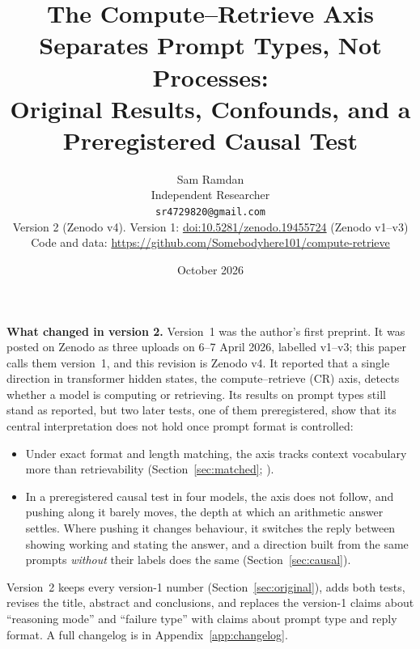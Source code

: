 \documentclass[11pt]{article}
\title{The Compute--Retrieve Axis Separates Prompt Types, Not Processes:\\ Original Results, Confounds, and a Preregistered Causal Test}
\author{
  Sam Ramdan\\
  Independent Researcher\\
  \texttt{sr4729820@gmail.com}\\[4pt]
  {\small Version 2 (Zenodo v4). Version 1: \href{https://doi.org/10.5281/zenodo.19455724}{doi:10.5281/zenodo.19455724} (Zenodo v1--v3)}\\
  {\small Code and data: \url{https://github.com/Somebodyhere101/compute-retrieve}}
}
\date{October 2026}
\begin{document}
\maketitle

\begin{framed}
\noindent\textbf{What changed in version 2.}
Version~1 was the author's first preprint. It was posted on Zenodo as three uploads on 6--7 April 2026, labelled v1--v3; this paper calls them version~1, and this revision is Zenodo v4. It reported that a single direction in transformer hidden states, the compute--retrieve (CR) axis, detects whether a model is computing or retrieving. Its results on prompt types still stand as reported, but two later tests, one of them preregistered, show that its central interpretation does not hold once prompt format is controlled:
\begin{itemize}
  \item Under exact format and length matching, the axis tracks context vocabulary more than retrievability (Section~\ref{sec:matched}; \citealp{ramdan2026fingerprint}).
  \item In a preregistered causal test in four models, the axis does not follow, and pushing along it barely moves, the depth at which an arithmetic answer settles. Where pushing it changes behaviour, it switches the reply between showing working and stating the answer, and a direction built from the same prompts \emph{without} their labels does the same (Section~\ref{sec:causal}).
\end{itemize}
Version~2 keeps every version-1 number (Section~\ref{sec:original}), adds both tests, revises the title, abstract and conclusions, and replaces the version-1 claims about ``reasoning mode'' and ``failure type'' with claims about prompt type and reply format. A full changelog is in Appendix~\ref{app:changelog}.
\end{framed}
\end{document}
